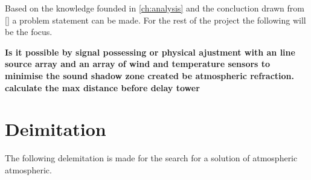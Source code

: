 Based on the knowledge founded in \autoref{ch:analysis} and the concluction drawn from \autoref{} a problem statement can be made. For the rest of the project the following will be the focus.


\textbf{Is it possible by signal possessing or physical ajustment with an line source array and an array of wind and temperature sensors to minimise the sound shadow zone created be atmospheric refraction. calculate the max distance before delay tower}

\section{Deimitation}
The following delemitation is made for the search for a solution of atmospheric atmospheric.